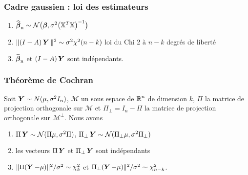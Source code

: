 
\begin{frame}
\frametitle{Cadre gaussien : loi des estimateurs}
\begin{prop}
\begin{enumerate}
\item  $\operatorname{\widehat{\boldsymbol{\beta}}_n} \sim {\mathcal N}\big(\boldsymbol{\beta}, \sigma^2 \big(\mathbb{X}^T\mathbb{X}\big)^{-1}\big)$
\item  $\|(I - A) \operatorname{\boldsymbol{Y}} \|^2 \sim
\sigma^2\chi^2(n-k)$ \alert{ loi du Chi 2 à $n-k$ degrés de liberté}
\item  $\operatorname{\widehat{\boldsymbol{\beta}}_n}$ et $(I - A) \operatorname{\boldsymbol{Y}}$ sont indépendants.
\end{enumerate}
\end{prop}
\end{frame}

\begin{frame}
\frametitle{Théorème de Cochran}
\begin{theo}
Soit $\operatorname{\boldsymbol{Y}} \sim N(\mu,\sigma^2 I_n)$, $\mathcal{M}$ un sous espace de $\operatorname{{\mathbb R}}^n$ de dimension $k$, $\Pi$ la matrice de projection orthogonale
sur $\mathcal{M}$ et $\Pi_{\perp}= I_n - \Pi$ la matrice de projection orthogonale sur $\mathcal{M}^\perp$. Nous avons
\begin{enumerate}
\item \alert<1>{$\Pi \operatorname{\boldsymbol{Y}} \sim \mathcal{N}(\Pi \mu, \sigma^2 \Pi)$, $\Pi_\perp \operatorname{\boldsymbol{Y}} \sim \mathcal{N}(\Pi_{\perp} \mu, \sigma^2 \Pi_{\perp})$}
\item \alert<2>{les vecteurs $\Pi \operatorname{\boldsymbol{Y}}$ et $\Pi_\perp \operatorname{\boldsymbol{Y}}$ sont indépendants}
\item \alert<3>{$\| \Pi(\operatorname{\boldsymbol{Y}} - \mu) \|^2 / \sigma^2 \sim \chi^2_k$ et $\Pi_\perp(\operatorname{\boldsymbol{Y}}-\mu) \|^2/\sigma^2 \sim \chi^2_{n-k}$}.
\end{enumerate}
\end{theo}
\end{frame}


